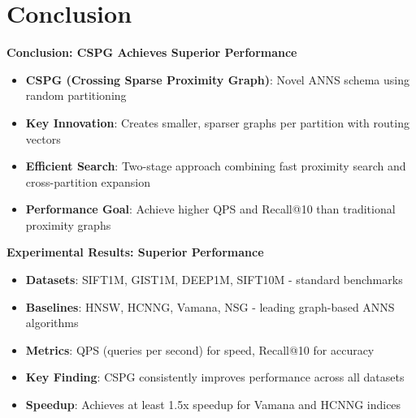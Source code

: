 \section{Conclusion}%
\begin{frame}
\begin{center}
\LARGE\textbf{Conclusion: CSPG Achieves Superior Performance}
\end{center}

\vspace{0.5cm}

\begin{itemize}
    \item \textbf{CSPG (Crossing Sparse Proximity Graph)}: Novel ANNS schema using random partitioning
    \item \textbf{Key Innovation}: Creates smaller, sparser graphs per partition with routing vectors
    \item \textbf{Efficient Search}: Two-stage approach combining fast proximity search and cross-partition expansion
    \item \textbf{Performance Goal}: Achieve higher QPS and Recall@10 than traditional proximity graphs
\end{itemize}
\end{frame}%
\begin{frame}
\begin{center}
\LARGE\textbf{Experimental Results: Superior Performance}
\end{center}

\vspace{0.5cm}

\begin{itemize}
    \item \textbf{Datasets}: SIFT1M, GIST1M, DEEP1M, SIFT10M - standard benchmarks
    \item \textbf{Baselines}: HNSW, HCNNG, Vamana, NSG - leading graph-based ANNS algorithms
    \item \textbf{Metrics}: QPS (queries per second) for speed, Recall@10 for accuracy
    \item \textbf{Key Finding}: CSPG consistently improves performance across all datasets
    \item \textbf{Speedup}: Achieves at least 1.5x speedup for Vamana and HCNNG indices
\end{itemize}
\end{frame}%
